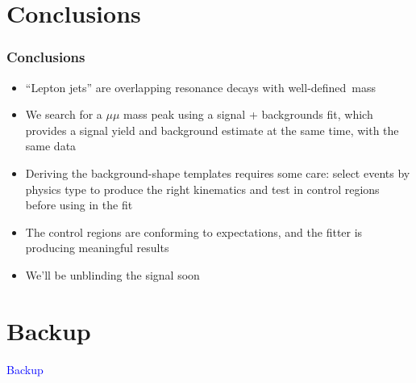 \documentclass[compress]{beamer}
\begin{document}
\section{Conclusions}

\begin{frame}
\frametitle{Conclusions}

\begin{itemize}\setlength{\itemsep}{0.5 cm}
\item ``Lepton jets'' are overlapping resonance decays with \mbox{well-defined mass\hspace{-1 cm}}

\item We search for a $\mu\mu$ mass peak using a signal + backgrounds
  fit, which provides a signal yield and background estimate at the
  same time, with the same data

\item Deriving the background-shape templates requires some care: select events by physics type to produce the right kinematics and test in control regions before using in the fit

\item The control regions are conforming to expectations, and the fitter is producing meaningful results

\item We'll be unblinding the signal soon
\end{itemize}

\label{numpages}
\end{frame}

\section*{Backup}
\begin{frame}
\begin{center}
\Huge \textcolor{blue}{Backup}
\end{center}
\end{frame}
\end{document}
